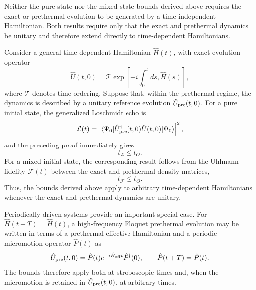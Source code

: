 \documentclass[aps,prl,amsfonts,floatfix,superscriptaddress,longbibliography,twocolumn,footinbib]{revtex4-2}
\begin{document}
Neither the pure-state nor the mixed-state bounds derived above requires
the exact or prethermal evolution to be generated by a time-independent
Hamiltonian. Both results require only that the exact and prethermal
dynamics be unitary and therefore extend directly to time-dependent
Hamiltonians.

Consider a general time-dependent Hamiltonian $\hat H(t)$, with exact
evolution operator
\begin{equation}
\hat U(t,0)
=
\mathcal{T}
\exp\left[
-i\int_0^t ds,\hat H(s)
\right],
\end{equation}
where $\mathcal{T}$ denotes time ordering. Suppose that, within the
prethermal regime, the dynamics is described by a unitary reference
evolution $\hat U_{\rm pre}(t,0)$. For a pure initial state, the
generalized Loschmidt echo is
\begin{equation}
\mathcal{L}(t)
=
\left|
\langle\Psi_0|
\hat U_{\rm pre}^\dagger(t,0)
\hat U(t,0)
|\Psi_0\rangle
\right|^2,
\end{equation}
and the preceding proof immediately gives
\begin{equation}
t_{\mathcal L}\leq t_O.
\end{equation}
For a mixed initial state, the corresponding result follows from the
Uhlmann fidelity $\mathcal F(t)$ between the exact and prethermal
density matrices,
\begin{equation}
t_{\mathcal F}\leq t_O.
\end{equation}
Thus, the bounds derived above apply to arbitrary time-dependent
Hamiltonians whenever the exact and prethermal dynamics are unitary.

Periodically driven systems provide an important special case. For
$\hat H(t+T)=\hat H(t)$, a high-frequency Floquet prethermal evolution
may be written in terms of a prethermal effective Hamiltonian and a
periodic micromotion operator $\hat P(t)$ as
\begin{equation}
\hat U_{\rm pre}(t,0)
=
\hat P(t)e^{-i\hat H_{\rm eff}t}\hat P^\dagger(0),
\qquad
\hat P(t+T)=\hat P(t).
\end{equation}
The bounds therefore apply both at stroboscopic times and, when the
micromotion is retained in $\hat U_{\rm pre}(t,0)$, at arbitrary times.
\end{document}
